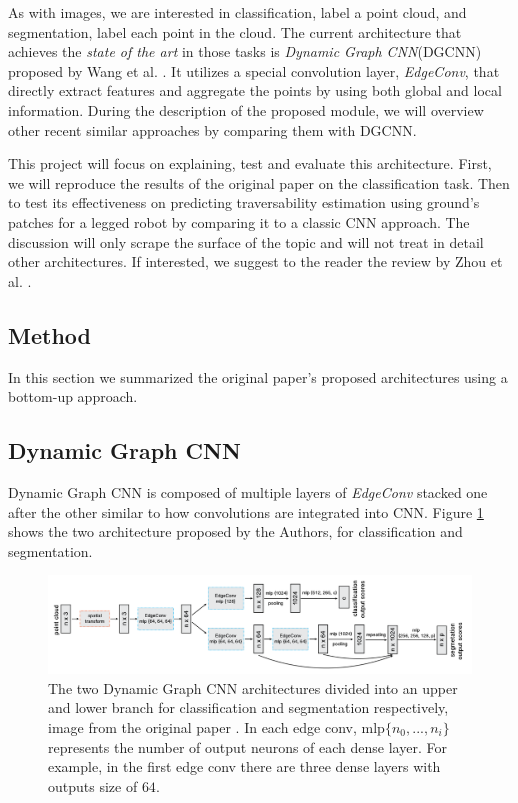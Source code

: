 \documentclass[twocolumn,showpacs,
  nofootinbib,aps,superscriptaddress,
  eqsecnum,prd,notitlepage,showkeys,10pt]{revtex4-1}
\begin{document}
As with images, we are interested in classification, label a point cloud, and segmentation, label each point in the cloud. The current architecture that achieves the \emph{state of the art} in those tasks is \emph{Dynamic Graph CNN}(DGCNN) proposed by Wang et al. \cite{dgcnn}. It utilizes a special convolution layer,  \emph{EdgeConv}, that directly extract features and aggregate the points by using both global and local information. During the description of the proposed module, we will overview other recent similar approaches by comparing them with DGCNN.

This project will focus on explaining, test and evaluate this architecture. First, we will reproduce the results of the original paper on the classification task. Then to test its effectiveness on predicting traversability estimation using ground's patches for a legged robot by comparing it to a classic CNN approach. The discussion will only scrape the surface of the topic and will not treat in detail other architectures. If interested, we suggest to the reader the review by Zhou et al. \cite{1812.08434}.
\subsection{Method}
In this section we summarized the original paper's proposed architectures using a bottom-up approach.
\subsection{Dynamic Graph CNN}
Dynamic Graph CNN is composed of multiple layers of \emph{EdgeConv} stacked one after the other similar to how convolutions are integrated into CNN. Figure \ref{fig : DGCNN} shows the two architecture proposed by the Authors, for classification and segmentation. 
\begin{figure}
  \centering
  \includegraphics[width=\linewidth]{images/DGCNN.png}
\caption{The two Dynamic Graph CNN architectures divided into an upper and lower branch for classification and segmentation respectively, image from the original paper \cite{dgcnn}. In each edge conv, mlp$\{n_0, ..., n_{i}\}$ represents the number of output neurons of each dense layer. For example, in the first edge conv there are three dense layers with outputs size of $64$.}
\label{fig : DGCNN}
\end{figure}
\end{document}
